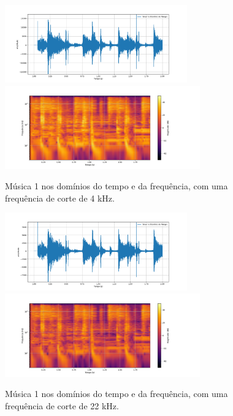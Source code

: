 \begin{figure}[htpb]
    \centering
    \includegraphics[width=0.7\textwidth]{figuras/fig26.png}
    \includegraphics[width=0.75\textwidth]{figuras/fig27.png}
    \caption{Música 1 nos domínios do tempo e da frequência, com uma frequência de corte de 4 kHz.}
    \label{fig26}
\end{figure}

\begin{figure}[htpb]
    \centering
    \includegraphics[width=0.7\textwidth]{figuras/fig30.png}
    \includegraphics[width=0.75\textwidth]{figuras/fig31.png}
    \caption{Música 1 nos domínios do tempo e da frequência, com uma frequência de corte de 22 kHz.}
    \label{fig30}
\end{figure}


